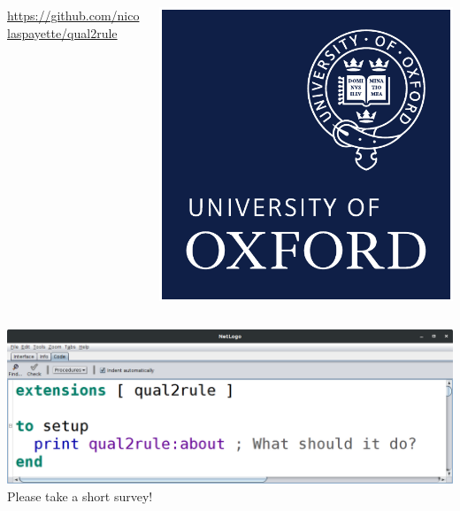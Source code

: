 \documentclass{beamer}
\begin{document}
\begin{frame}
  \begin{columns}[c]
    \begin{column}{.85\textwidth}
      \centering\VERYHuge\url{https://github.com/nicolaspayette/qual2rule}
    \end{column}
    \begin{column}{.1\textwidth}
      \includegraphics[width=\linewidth]{ox_brand_cmyk_rev.pdf}
    \end{column}
  \end{columns}
  \vfill
  \begin{center}
    \includegraphics[height=0.35\paperheight]{screenshot}
    \vfill
    \VERYHuge Please take a short survey!\par

\end{center}
\end{frame}
\end{document}
